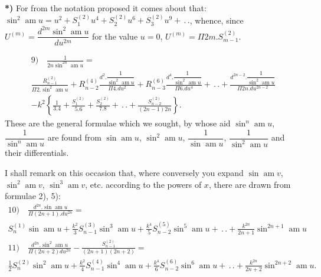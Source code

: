 \documentclass{article}
\begin{document}
\textbf{*)} For from the notation proposed it comes about that: $\sin^{2}\operatorname{am}u=u^{2}+S_{1}^{(2)}u^{4}+S_{2}^{(2)}u^{6}+S_{3}^{(2)}u^{9}+\,.\,.$, whence, since $U^{(m)}=\dfrac{d^{2m}\sin^{2}\operatorname{am}u}{du^{2m}}$ for the value $u=0$, $U^{(m)}=\Pi 2m.S_{m-1}^{(2)}$.

\[
\begin{gathered}
\text{9)}\quad\frac{1}{2n\sin^{2n}\operatorname{am}u}=\\[1.5ex]
\frac{R_{n-1}^{(2)}}{\Pi 2.\sin^{2}\operatorname{am}u}+R_{n-2}^{(4)}\frac{d^{2}.\dfrac{1}{\sin^{2}\operatorname{am}u}}{\Pi 4.du^{2}}+R_{n-3}^{(6)}\frac{d^{4}.\dfrac{1}{\sin^{2}\operatorname{am}u}}{\Pi 6.du^{4}}+\,.\,.+\frac{d^{2n-2}.\dfrac{1}{\sin^{2}\operatorname{am}u}}{\Pi 2n.du^{2n-2}}\\[1.5ex]
-k^{2}\left\{\frac{1}{3.4}+\frac{S_{1}^{(2)}}{5.6}+\frac{S_{2}^{(2)}}{7.8}+\,.\,.+\frac{S_{n-2}^{(2)}}{(2n-1)2n}\right\}.
\end{gathered}
\]
These are the general formulae which we sought, by whose aid $\sin^{n}\operatorname{am}u$, $\dfrac{1}{\sin^{n}\operatorname{am}u}$ are found from $\sin\operatorname{am}u$, $\sin^{2}\operatorname{am}u$, $\dfrac{1}{\sin\operatorname{am}u}$, $\dfrac{1}{\sin^{2}\operatorname{am}u}$ and their differentials.

I shall remark on this occasion that, where conversely you expand $\sin\operatorname{am}v$, $\sin^{2}\operatorname{am}v$, $\sin^{3}\operatorname{am}v$, etc. according to the powers of $x$, there are drawn from formulae 2), 5):
\[
\begin{gathered}
\text{10)}\quad\frac{d^{2n}.\sin\operatorname{am}u}{\Pi(2n+1).du^{2n}}=\\[1.5ex]
S_{n}^{(1)}\sin\operatorname{am}u+\frac{k^{2}}{3}S_{n-1}^{(3)}\sin^{3}\operatorname{am}u+\frac{k^{4}}{5}S_{n-2}^{(5)}\sin^{5}\operatorname{am}u+\,.\,.+\frac{k^{2n}}{2n+1}\sin^{2n+1}\operatorname{am}u\\[1.5ex]
\text{11)}\quad\frac{d^{2n}.\sin^{2}\operatorname{am}u}{\Pi(2n+2)du^{2n}}-\frac{S_{n-1}^{(2)}}{(2n+1)(2n+2)}=\\[1.5ex]
\frac{1}{2}S_{n}^{(2)}\sin^{2}\operatorname{am}u+\frac{k^{2}}{4}S_{n-1}^{(4)}\sin^{4}\operatorname{am}u+\frac{k^{4}}{6}S_{n-2}^{(6)}\sin^{6}\operatorname{am}u+\,.\,.+\frac{k^{2n}}{2n+2}\sin^{2n+2}\operatorname{am}u.
\end{gathered}
\]
\end{document}
